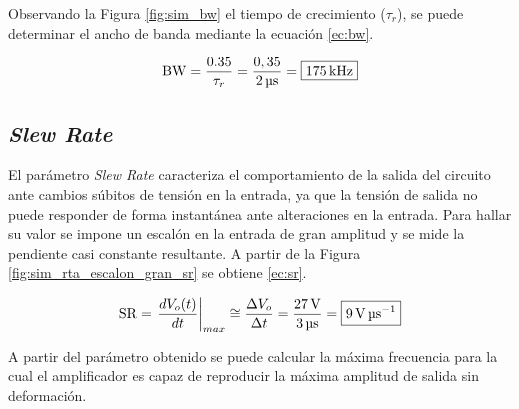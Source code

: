 
	Observando la Figura \ref{fig:sim_bw} el tiempo de crecimiento ($\tau_r$), se puede determinar el ancho de banda mediante la ecuación \eqref{ec:bw}.

	\begin{equation}
		\centering
		\mathrm{BW} = \frac{\num{0,35}}{\tau_r} = \frac{0,35}{\SI{2}{\micro\second}} = \boxed{\SI{175}{\kilo\hertz}}
		\label{ec:bw}
	\end{equation}

\subsection{\textit{Slew Rate}}


	
	El parámetro \textit{Slew Rate} caracteriza el comportamiento de la salida del circuito ante cambios súbitos de tensión en la entrada, ya que la tensión de salida no puede responder de forma instantánea ante alteraciones en la entrada. Para hallar su valor se impone un escalón en la entrada de gran amplitud y se mide la pendiente casi constante resultante. A partir de la Figura \ref{fig:sim_rta_escalon_gran_sr} se obtiene \eqref{ec:sr}.

	\begin{equation}
	\centering
	\mathrm{SR} = \left. \frac{dV_o(t)}{dt} \right\rvert_{max} \cong \frac{\Delta V_o}{\Delta t} = \frac{\SI{27}{\volt}}{\SI{3}{\micro\second}} = \boxed{\SI{9}{\volt\per\micro\second}}
	\label{ec:sr}
\end{equation}


A partir del parámetro obtenido se puede calcular la máxima frecuencia para la cual el amplificador es capaz de reproducir la máxima amplitud de salida sin deformación.

